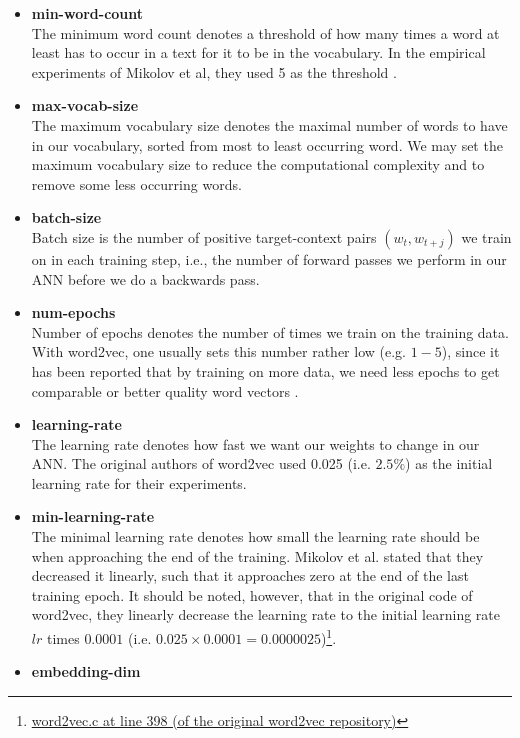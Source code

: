 \begin{itemize}
    \item \textbf{min-word-count} \\
        The minimum word count denotes a threshold of how many times a word at least has to occur in a text for it to be in the vocabulary. In the empirical experiments of Mikolov et al, they used 5 as the threshold \cite{mikolov2013b}.
    \item \textbf{max-vocab-size} \\
        The maximum vocabulary size denotes the maximal number of words to have in our vocabulary, sorted from most to least occurring word. We may set the maximum vocabulary size to reduce the computational complexity and to remove some less occurring words.
    \item \textbf{batch-size} \\
        Batch size is the number of positive target-context pairs $(w_t, w_{t+j})$ we train on in each training step, i.e., the number of forward passes we perform in our ANN before we do a backwards pass.
    \item \textbf{num-epochs} \\
        Number of epochs denotes the number of times we train on the training data. With word2vec, one usually sets this number rather low (e.g. $1-5$), since it has been reported that by training on more data, we need less epochs to get comparable or better quality word vectors \cite{mikolov2013a}.
    \item \textbf{learning-rate} \\
        The learning rate denotes how fast we want our weights to change in our ANN. The original authors of word2vec used 0.025 (i.e. $2.5\%$) as the initial learning rate for their experiments.
    \item \textbf{min-learning-rate} \\
        The minimal learning rate denotes how small the learning rate should be when approaching the end of the training. Mikolov et al. stated that they decreased it linearly, such that it approaches zero at the end of the last training epoch. It should be noted, however, that in the original code of word2vec, they linearly decrease the learning rate to the initial learning rate $lr$ times $0.0001$ (i.e. $0.025 \times 0.0001 = 0.0000025$)\footnote{\href{https://github.com/tmikolov/word2vec/blob/e092540633572b883e25b367938b0cca2cf3c0e7/word2vec.c\#L398}{word2vec.c at line 398 (of the original word2vec repository)}}.
    \item \textbf{embedding-dim} \\

\end{itemize}
